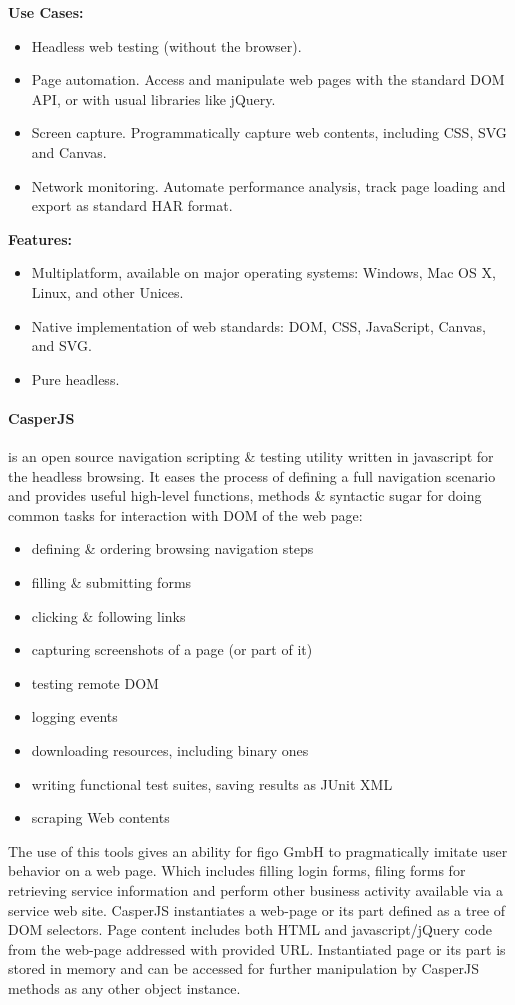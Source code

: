 \textbf{Use Cases:}
\begin{itemize}
	\item Headless web testing (without the browser).
	\item Page automation. Access and manipulate web pages with the standard DOM API, or with usual libraries like jQuery.
	\item Screen capture. Programmatically capture web contents, including CSS, SVG and Canvas.
	\item Network monitoring. Automate performance analysis, track page loading and export as standard HAR format.
\end{itemize}

\textbf{Features:}
\begin{itemize}
	\item Multiplatform, available on major operating systems: Windows, Mac OS X, Linux, and other Unices.
	\item Native implementation of web standards: DOM, CSS, JavaScript, Canvas, and SVG.
	\item Pure headless.
\end{itemize}

\paragraph{CasperJS} is an open source navigation scripting \& testing utility written in javascript for the headless browsing. It eases the process of defining a full navigation scenario and provides useful high-level functions, methods \& syntactic sugar for doing common tasks for interaction with DOM of the web page\cite{casperjs}:
\begin{itemize}
	\item defining \& ordering browsing navigation steps
	\item filling \& submitting forms
	\item clicking \& following links
	\item capturing screenshots of a page (or part of it)
	\item testing remote DOM
	\item logging events
	\item downloading resources, including binary ones
	\item writing functional test suites, saving results as JUnit XML
	\item scraping Web contents
\end{itemize}

The use of this tools gives an ability for figo GmbH to pragmatically imitate user behavior on a web page. Which includes filling login forms, filing forms for retrieving service information and perform other business activity available via a service web site. CasperJS instantiates a web-page or its part defined as a tree of DOM selectors.  Page content includes both HTML and javascript/jQuery code from the web-page addressed with provided URL. Instantiated page or its part is stored in memory and can be accessed for further manipulation by CasperJS methods as any other object instance.